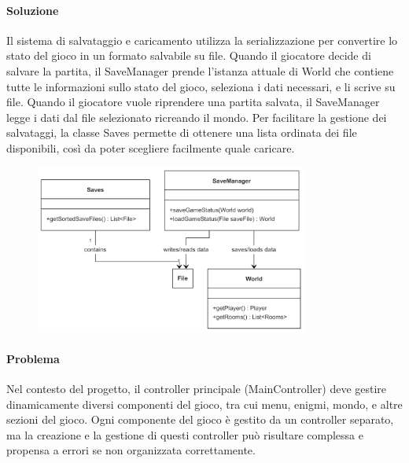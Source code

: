 \documentclass[a4paper,12pt]{report}
\begin{document}
\paragraph{Soluzione} Il sistema di salvataggio e caricamento utilizza la serializzazione per convertire lo stato del gioco in un formato salvabile su file. Quando il giocatore decide di salvare la partita, il SaveManager prende l'istanza attuale di World che contiene tutte le informazioni sullo stato del gioco, seleziona i dati necessari, e li scrive su file. Quando il giocatore vuole riprendere una partita salvata, il SaveManager legge i dati dal file selezionato ricreando il mondo. Per facilitare la gestione dei salvataggi, la classe Saves permette di ottenere una lista ordinata dei file disponibili, così da poter scegliere facilmente quale caricare.
%
\begin{figure}[h]  %
    \centering
    \includegraphics[width=0.8\textwidth]{img/saves.png}  %
    \label{img:saves}
\end{figure}
%
\paragraph{Problema} Nel contesto del progetto, il controller principale (MainController) deve gestire dinamicamente diversi componenti del gioco, tra cui menu, enigmi, mondo, e altre sezioni del gioco. Ogni componente del gioco è gestito da un controller separato, ma la creazione e la gestione di questi controller può risultare complessa e propensa a errori se non organizzata correttamente.
\end{document}
